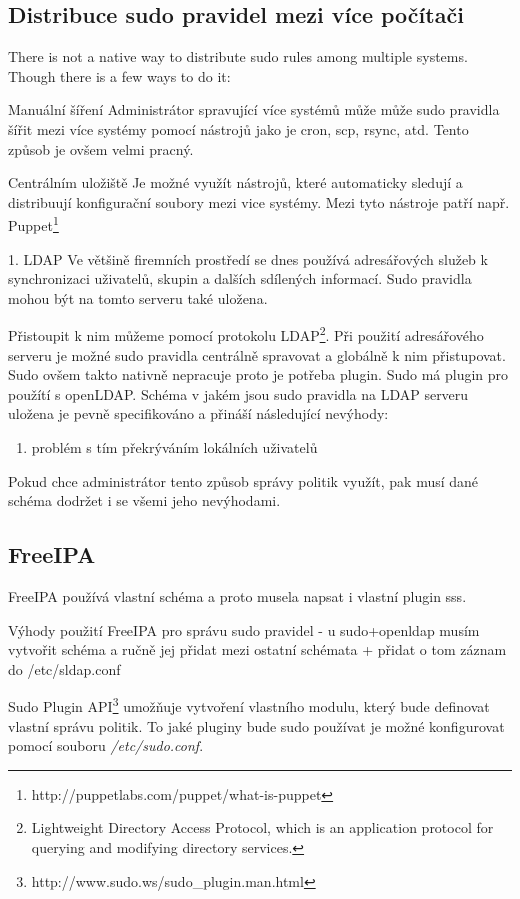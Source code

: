 \documentclass[10pt,a4paper,notitlepage]{article}
\begin{document}
\subsection{Distribuce sudo pravidel mezi více počítači}
There is not a native way to distribute sudo rules among multiple systems. Though there is a few ways to do it:

 Manuální šíření
Administrátor spravující více systémů může může sudo pravidla šířit mezi více systémy pomocí nástrojů jako je cron, scp, rsync, atd. Tento způsob je ovšem velmi pracný.

Centrálním uložiště
Je možné využít nástrojů, které automaticky sledují a distribuují konfigurační soubory mezi vice systémy. Mezi tyto nástroje patří např. Puppet\footnote{http://puppetlabs.com/puppet/what-is-puppet}
 

1.	LDAP
Ve většině firemních prostředí se dnes používá adresářových služeb k synchronizaci uživatelů, skupin a dalších sdílených informací. Sudo pravidla mohou být na tomto serveru také uložena. 


 Přistoupit k nim můžeme pomocí protokolu LDAP\footnote{Lightweight
	Directory Access Protocol, which is an application protocol for querying and
modifying directory services.}. Při použití adresářového serveru je možné sudo
pravidla centrálně spravovat a globálně k nim přistupovat. Sudo ovšem takto
nativně nepracuje proto je potřeba plugin. Sudo má plugin pro použítí s
openLDAP. Schéma v jakém jsou sudo pravidla na LDAP serveru uložena je pevně
specifikováno a přináší následující nevýhody: 
\begin{enumerate} 
	\item problém s	tím překrýváním lokálních uživatelů 
\end{enumerate}

Pokud chce administrátor tento způsob správy politik využít, pak musí dané
schéma dodržet i se všemi jeho nevýhodami.



\subsection{FreeIPA}
FreeIPA používá vlastní schéma a proto musela napsat i vlastní plugin sss.


Výhody použití FreeIPA pro správu sudo pravidel - u sudo+openldap musím vytvořit
schéma a ručně jej přidat mezi ostatní schémata + přidat o tom záznam do
/etc/sldap.conf


Sudo Plugin API\footnote{http://www.sudo.ws/sudo\_plugin.man.html}
umožňuje vytvoření vlastního modulu, který bude definovat vlastní správu
politik.  To jaké pluginy bude sudo používat je možné konfigurovat pomocí
souboru \textit{/etc/sudo.conf}.
\end{document}
